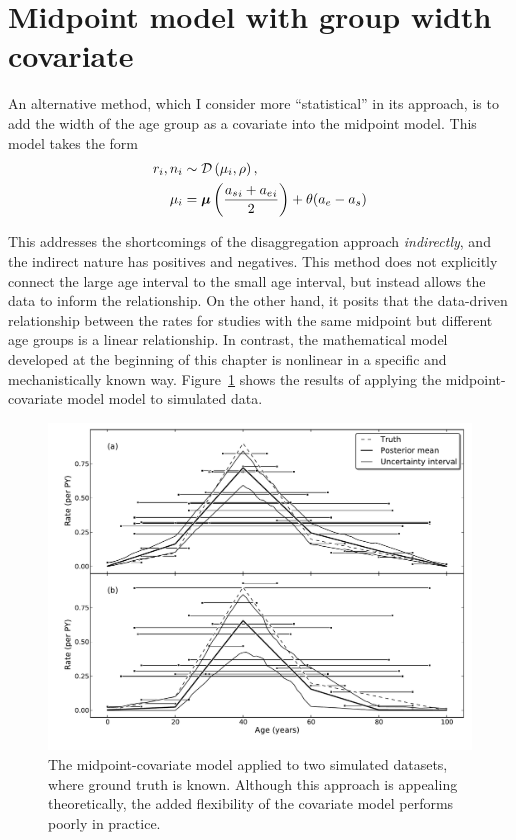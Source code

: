 \section{Midpoint model with group width covariate}
An alternative method, which I consider more ``statistical'' in its
approach, is to add the width of the age group as a covariate into the
midpoint model.  This model takes the form
\begin{align*}
r_i, n_i &\sim \mathcal{D}\left(\mu_i, \rho\right),\\
\mu_i &= \boldsymbol{\mu}\left(\frac{{a_s}_i+{a_e}_i}{2}\right) + \theta (a_e - a_s)
\end{align*}

This addresses the shortcomings of the disaggregation approach
\emph{indirectly}, and the indirect nature has positives and
negatives.  This method does not explicitly connect the large age
interval to the small age interval, but instead allows the data to
inform the relationship.  On the other hand, it posits that the
data-driven relationship between the rates for studies with the same
midpoint but different age groups is a linear relationship. In
contrast, the mathematical model developed at the beginning of this
chapter is nonlinear in
a specific and mechanistically known way.
Figure~\ref{midpoint-covariate} shows the results of applying the midpoint-covariate model
model to simulated data.


\begin{figure}[h]
\begin{center}
\includegraphics[width=\textwidth]{age_group_midpoint_covariate.pdf}
\caption{The midpoint-covariate model applied to two simulated
  datasets, where ground truth is known. Although this approach is
  appealing theoretically, the added flexibility of the covariate
  model performs poorly in practice. }
\label{midpoint-covariate}
\end{center}
\end{figure}

